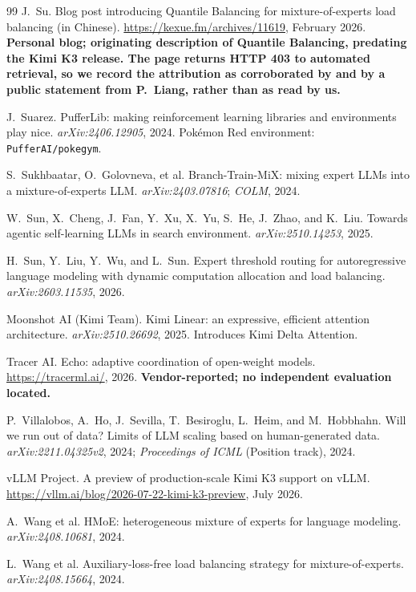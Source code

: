 \documentclass[11pt]{article}
\begin{document}
\begin{thebibliography}{99}
 J.~Su. Blog post introducing Quantile Balancing for mixture-of-experts load balancing (in Chinese). \url{https://kexue.fm/archives/11619}, February 2026. \textbf{Personal blog; originating description of Quantile Balancing, predating the Kimi K3 release. The page returns HTTP 403 to automated retrieval, so we record the attribution as corroborated by \cite{openathena2026qb} and by a public statement from P.~Liang, rather than as read by us.}

 J.~Suarez. PufferLib: making reinforcement learning libraries and environments play nice. \emph{arXiv:2406.12905}, 2024. Pokémon Red environment: \texttt{PufferAI/pokegym}.

 S.~Sukhbaatar, O.~Golovneva, et al. Branch-Train-MiX: mixing expert LLMs into a mixture-of-experts LLM. \emph{arXiv:2403.07816}; \emph{COLM}, 2024.

 W.~Sun, X.~Cheng, J.~Fan, Y.~Xu, X.~Yu, S.~He, J.~Zhao, and K.~Liu. Towards agentic self-learning LLMs in search environment. \emph{arXiv:2510.14253}, 2025.

 H.~Sun, Y.~Liu, Y.~Wu, and L.~Sun. Expert threshold routing for autoregressive language modeling with dynamic computation allocation and load balancing. \emph{arXiv:2603.11535}, 2026.

 Moonshot AI (Kimi Team). Kimi Linear: an expressive, efficient attention architecture. \emph{arXiv:2510.26692}, 2025. Introduces Kimi Delta Attention.

 Tracer AI. Echo: adaptive coordination of open-weight models. \url{https://tracerml.ai/}, 2026. \textbf{Vendor-reported; no independent evaluation located.}

 P.~Villalobos, A.~Ho, J.~Sevilla, T.~Besiroglu, L.~Heim, and M.~Hobbhahn. Will we run out of data? Limits of LLM scaling based on human-generated data. \emph{arXiv:2211.04325v2}, 2024; \emph{Proceedings of ICML} (Position track), 2024.

 vLLM Project. A preview of production-scale Kimi K3 support on vLLM. \url{https://vllm.ai/blog/2026-07-22-kimi-k3-preview}, July 2026.

 A.~Wang et al. HMoE: heterogeneous mixture of experts for language modeling. \emph{arXiv:2408.10681}, 2024.

 L.~Wang et al. Auxiliary-loss-free load balancing strategy for mixture-of-experts. \emph{arXiv:2408.15664}, 2024.


\end{thebibliography}
\end{document}
